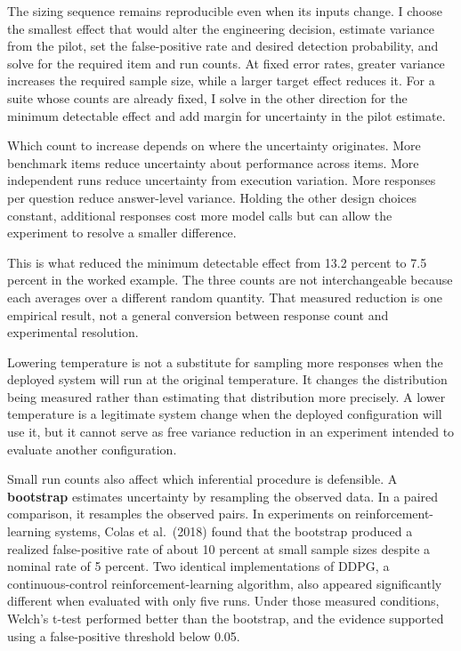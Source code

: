 The sizing sequence remains reproducible even when its inputs change. I choose the smallest effect that would alter the engineering decision, estimate variance from the pilot, set the false-positive rate and desired detection probability, and solve for the required item and run counts. At fixed error rates, greater variance increases the required sample size, while a larger target effect reduces it. For a suite whose counts are already fixed, I solve in the other direction for the minimum detectable effect and add margin for uncertainty in the pilot estimate.

Which count to increase depends on where the uncertainty originates. More benchmark items reduce uncertainty about performance across items. More independent runs reduce uncertainty from execution variation. More responses per question reduce answer-level variance. Holding the other design choices constant, additional responses cost more model calls but can allow the experiment to resolve a smaller difference.

This is what reduced the minimum detectable effect from 13.2 percent to 7.5 percent in the worked example. The three counts are not interchangeable because each averages over a different random quantity. That measured reduction is one empirical result, not a general conversion between response count and experimental resolution.

Lowering temperature is not a substitute for sampling more responses when the deployed system will run at the original temperature. It changes the distribution being measured rather than estimating that distribution more precisely. A lower temperature is a legitimate system change when the deployed configuration will use it, but it cannot serve as free variance reduction in an experiment intended to evaluate another configuration.

Small run counts also affect which inferential procedure is defensible. A \textbf{bootstrap} estimates uncertainty by resampling the observed data. In a paired comparison, it resamples the observed pairs. In experiments on reinforcement-learning systems, Colas et al.~(2018) found that the bootstrap produced a realized false-positive rate of about 10 percent at small sample sizes despite a nominal rate of 5 percent. Two identical implementations of DDPG, a continuous-control reinforcement-learning algorithm, also appeared significantly different when evaluated with only five runs. Under those measured conditions, Welch's t-test performed better than the bootstrap, and the evidence supported using a false-positive threshold below 0.05.

